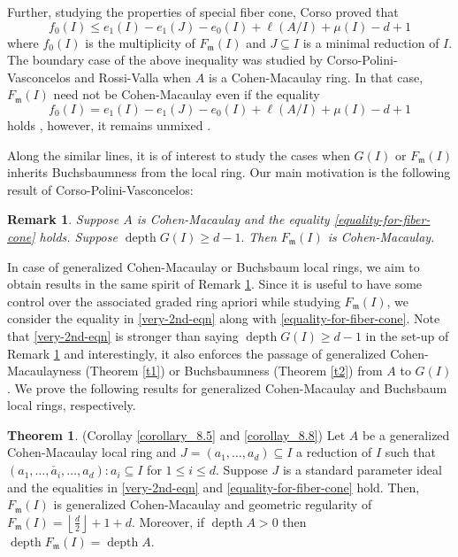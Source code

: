 \documentclass[11pt,reqno]{amsart}
\newtheorem{remark}[theorem]{Remark}
\theoremstyle{definition}
\newcommand{\m}{\mathfrak m}
\newtheorem{mainthm}{Theorem}
\DeclareMathOperator{\depth}{depth}
\numberwithin{equation}{section}
\begin{document}
Further, studying the properties of special fiber cone, Corso \cite{Corso09} proved that $$f_0(I)\leq e_1(I)-e_1(J)-e_0(I)+\ell(A/I)+\mu(I)-d+1$$ where $f_0(I)$ is the multiplicity of $F_{\m}(I)$ and $J\subseteq I$ is a minimal reduction of $I$.  The boundary case of the above inequality  was studied by Corso-Polini-Vasconcelos \cite{CPV}  and Rossi-Valla  \cite[Chapter 5]{rossi-valla} when $A$ is a Cohen-Macaulay ring. In that case, $F_\m(I)$ need not be Cohen-Macaulay even if the equality
\begin{equation}\label{equality-for-fiber-cone}
f_0(I)= e_1(I)-e_1(J)-e_0(I)+\ell(A/I)+\mu(I)-d+1
	\end{equation}
holds \cite[Example 2.3]{CPV}, however, it remains unmixed \cite[Theorem 2.5]{CPV}. 

Along the similar lines, it is of interest to study the cases when $G(I)$ or $F_\m(I)$ inherits Buchsbaumness from the local ring.  
Our main motivation  is the following result of Corso-Polini-Vasconcelos:
	\begin{remark}\label{remark-intro}\cite[Corollary 2.6 ]{CPV}
		Suppose $A$ is Cohen-Macaulay and the equality  \eqref{equality-for-fiber-cone} holds. Suppose $\depth G(I)\geq d-1.$ Then $F_\m(I)$ is Cohen-Macaulay. 
	\end{remark}
In case of generalized Cohen-Macaulay or Buchsbaum local rings, we aim to obtain results in the same spirit of Remark \ref{remark-intro}. Since it is useful to have some control over the associated graded ring apriori while studying $F_\m(I)$, we consider the equality in \eqref{very-2nd-eqn}
along with \eqref{equality-for-fiber-cone}. Note that  \eqref{very-2nd-eqn}  is stronger than saying $\depth G(I)\geq d-1$ in the set-up of Remark \ref{remark-intro} and interestingly,  
it also enforces the passage of generalized Cohen-Macaulayness (Theorem \ref{t1}) or Buchsbaumness (Theorem \ref{t2}) from $A$ to $G(I)$. 
We prove the following results for generalized Cohen-Macaulay and Buchsbaum local rings, respectively. %
\begin{mainthm}\label{theorem-fiber-m1} (Corollay \ref{corollary_8.5} and \ref{corollay_8.8})
	Let $A$ be a generalized Cohen-Macaulay local ring and  $J=(a_1,\ldots,a_d)\subseteq I$  a reduction of $I$  such that $(a_1,\ldots, \check{a_i},\ldots,a_d):a_i\subseteq I$ for $1\leq i\leq d$. Suppose $J$ is a standard parameter ideal and the equalities in  \eqref{very-2nd-eqn} and \eqref{equality-for-fiber-cone} hold. 
Then,  $F_\m(I)$ is generalized Cohen-Macaulay and geometric regularity of $F_{\m}(I)=\left \lfloor \frac{d}{2}\right \rfloor +1+d$. Moreover, if $\depth A>0$ then  $\depth F_\m(I)=\depth A.$ 
\end{mainthm}
 
\end{document}
